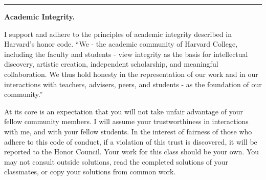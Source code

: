 \documentclass[12pt,letterpaper]{exam}
\begin{document}



\vspace{0.5cm}
\hrule
\vspace{0.5cm}



\noindent\textbf{Academic Integrity.}

I support and adhere to the principles of academic integrity described in Harvard’s honor code.  “We - the academic community of Harvard College, including the faculty and students - view integrity as the basis for intellectual discovery, artistic creation, independent scholarship, and meaningful collaboration. We thus hold honesty in the representation of our work and in our interactions with teachers, advisers, peers, and students - as the foundation of our community.”  

At its core is an expectation that you will not take unfair advantage of your fellow community members. 
I will assume your trustworthiness in interactions with me, and with your fellow students.  In the interest of fairness of those who adhere to this code of conduct, if a violation of this trust is discovered, it will be reported to the Honor Council.
Your work for this class should be your own.  You may not consult outside solutions, read the completed solutions of your classmates, or copy your solutions from common work.
\end{document}
